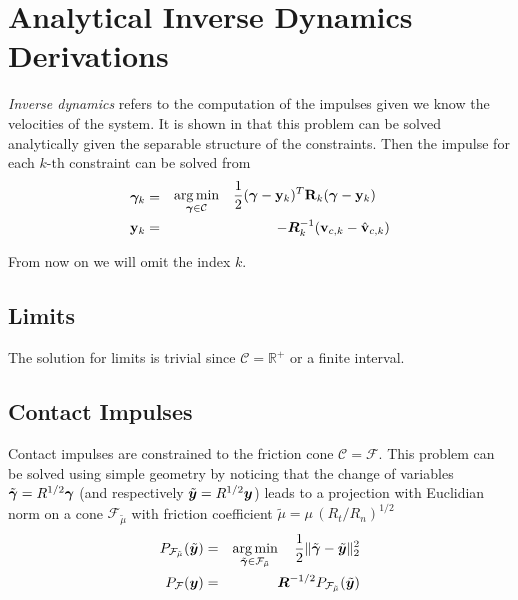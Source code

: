 \section{Analytical Inverse Dynamics Derivations}
\label{app:analytical_inverse_dynamics_derivations}

\textit{Inverse dynamics} refers to the computation of the impulses given we
know the velocities of the system. It is shown in \cite{bib:todorov2014} that
this problem can be solved analytically given the separable structure of the
constraints. Then the impulse for each $k\text{-th}$ constraint can be solved
from
\begin{eqnarray}
	{\bm\gamma}_k&=&
	\begin{aligned}
		\operatorname*{arg\,min}_{{\bm\gamma}\in\mathcal{C}} \quad &
	\frac{1}{2}({\bm\gamma}-{\mathbf{y}}_k)^T{\mathbf{R}}_k({\bm\gamma}-{\mathbf{y}}_k) \end{aligned}\\
	{\mathbf{y}}_k &=& -{\bm{R}}_k^{-1}({\mathbf{v}}_{c,k}-\hat{{\mathbf{v}}}_{c,k})
\end{eqnarray}

From now on we will omit the index $k$. 

\subsection{Limits}
The solution for limits is trivial since $\mathcal{C}=\mathbb{R}^+$ or a finite
interval. 

\subsection{Contact Impulses}

Contact impulses are constrained to the friction cone $\mathcal{C}=\mathcal{F}$.
This problem can be solved using simple geometry by noticing that the change of
variables $\tilde{{\bm\gamma}}=R^{1/2}{\bm\gamma}$ (and respectively
$\tilde{{\bm{y}}}=R^{1/2}{\bm{y}}$) leads to a projection with Euclidian norm on a
cone $\mathcal{F}_{\tilde\mu}$ with friction coefficient
$\tilde\mu=\mu\,(R_t/R_n)^{1/2}$
\begin{eqnarray}
	P_\mathcal{F_{\tilde\mu}}(\tilde{\vf{y}})&=&\argmin_{\tilde\bgamma\in\mathcal{F_{\tilde\mu}}}
		\quad \frac{1}{2}\Vert\tilde\bgamma-\tilde{\vf{y}}\Vert_2^2\nonumber\\
	P_\mathcal{F}(\vf{y}) &=&
	\vf{R}^{-1/2}P_\mathcal{F_{\tilde\mu}}(\tilde{\vf{y}})
	\label{eq:local_optimization_problem_tilde}
\end{eqnarray}

